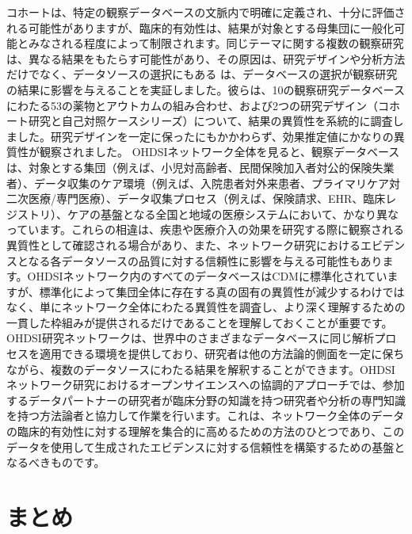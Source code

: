 \documentclass[
  11pt]{book}
\theoremstyle{definition}
\theoremstyle{definition}
\theoremstyle{definition}
\theoremstyle{definition}
\theoremstyle{remark}
\begin{document}
コホートは、特定の観察データベースの文脈内で明確に定義され、十分に評価される可能性がありますが、臨床的有効性は、結果が対象とする母集団に一般化可能とみなされる程度によって制限されます。同じテーマに関する複数の観察研究は、異なる結果をもたらす可能性があり、その原因は、研究デザインや分析方法だけでなく、データソースの選択にもある \citet{madigan_2013} は、データベースの選択が観察研究の結果に影響を与えることを実証しました。彼らは、10の観察研究データベースにわたる53の薬物とアウトカムの組み合わせ、および2つの研究デザイン（コホート研究と自己対照ケースシリーズ）について、結果の異質性を系統的に調査しました。研究デザインを一定に保ったにもかかわらず、効果推定値にかなりの異質性が観察されました。 OHDSIネットワーク全体を見ると、観察データベースは、対象とする集団（例えば、小児対高齢者、民間保険加入者対公的保険失業者）、データ収集のケア環境（例えば、入院患者対外来患者、プライマリケア対二次医療/専門医療）、データ収集プロセス（例えば、保険請求、EHR、臨床レジストリ）、ケアの基盤となる全国と地域の医療システムにおいて、かなり異なっています。これらの相違は、疾患や医療介入の効果を研究する際に観察される異質性として確認される場合があり、また、ネットワーク研究におけるエビデンスとなる各データソースの品質に対する信頼性に影響を与える可能性もあります。OHDSIネットワーク内のすべてのデータベースはCDMに標準化されていますが、標準化によって集団全体に存在する真の固有の異質性が減少するわけではなく、単にネットワーク全体にわたる異質性を調査し、より深く理解するための一貫した枠組みが提供されるだけであることを理解しておくことが重要です。OHDSI研究ネットワークは、世界中のさまざまなデータベースに同じ解析プロセスを適用できる環境を提供しており、研究者は他の方法論的側面を一定に保ちながら、複数のデータソースにわたる結果を解釈することができます。OHDSIネットワーク研究におけるオープンサイエンスへの協調的アプローチでは、参加するデータパートナーの研究者が臨床分野の知識を持つ研究者や分析の専門知識を持つ方法論者と協力して作業を行います。これは、ネットワーク全体のデータの臨床的有効性に対する理解を集合的に高めるための方法のひとつであり、このデータを使用して生成されたエビデンスに対する信頼性を構築するための基盤となるべきものです。

\section{まとめ}\label{ux307eux3068ux3081-13}
\end{document}
